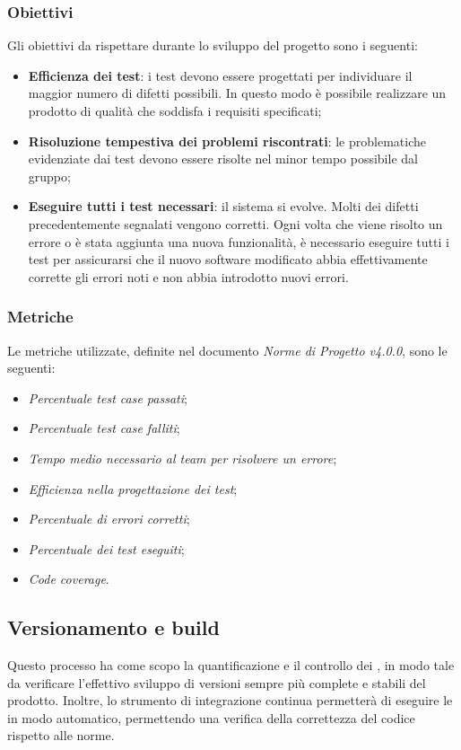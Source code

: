 \subsubsection{Obiettivi} 
Gli obiettivi da rispettare durante lo sviluppo del progetto sono i seguenti:
\begin{itemize}
	\item{\textbf{Efficienza dei test}: i test devono essere progettati per individuare il maggior numero di difetti possibili. In questo modo è possibile realizzare un prodotto di qualità che soddisfa i requisiti specificati;}
	\item{\textbf{Risoluzione tempestiva dei problemi riscontrati}: le problematiche evidenziate dai test devono essere risolte nel minor tempo possibile dal gruppo;}
	\item{\textbf{Eseguire tutti i test necessari}: il sistema si evolve. Molti dei difetti precedentemente segnalati vengono corretti. Ogni volta che viene risolto un errore o è stata aggiunta una nuova funzionalità, è necessario eseguire tutti i test per assicurarsi che il nuovo software modificato abbia effettivamente corrette gli errori noti e non abbia introdotto nuovi errori.}
\end{itemize}
\subsubsection{Metriche}
Le metriche utilizzate, definite nel documento \emph{Norme di Progetto v4.0.0}, sono le seguenti:
\begin{itemize}
	\item{\emph{Percentuale test case passati};}
	\item{\emph{Percentuale test case falliti};}
	\item{\emph{Tempo medio necessario al team per risolvere un errore};}
	\item{\emph{Efficienza nella progettazione dei test};}
	\item{\emph{Percentuale di errori corretti};}
	\item{\emph{Percentuale dei test eseguiti};}
	\item{\emph{Code coverage}.}

\end{itemize}

\subsection{Versionamento e build} 
Questo processo ha come scopo la quantificazione e il controllo dei , in modo tale da verificare l'effettivo sviluppo di versioni sempre più complete e stabili del prodotto. Inoltre, lo strumento di integrazione continua  permetterà di eseguire le  in modo automatico, permettendo una verifica della correttezza del codice rispetto alle norme.
